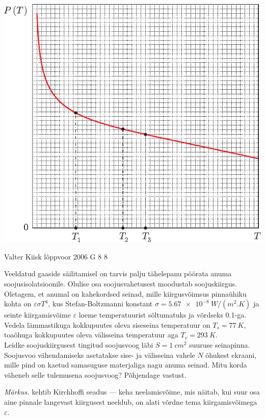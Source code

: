 \documentclass[11pt]{article}
\begin{document}
{{\begin{center}
	\includegraphics[width=0.8\linewidth]{2007-v3g-07-yl}
\end{center}
\fi
}

{Valter Kiisk} %
{lõppvoor} %
{2006} %
{G 8} %
{8} %
{
\ifStatement
Veeldatud gaaside säilitamisel on tarvis palju tähelepanu pöörata anuma soojusisolatsioonile. Olulise osa soojusvahetusest moodustab soojuskiirgus. Oletagem, et anumal on kahekordsed seinad, mille kiirgusvõimsus pinnaühiku kohta on $\varepsilon \sigma T^4$, kus Stefan-Boltzmanni konstant $\sigma = \SI{5,67e-8}{W/(m^2.K)}$ ja seinte kiirgamisvõime $\varepsilon$ loeme temperatuurist sõltumatuks ja võrdseks \num{0,1}-ga. Vedela lämmastikuga kokkupuutes oleva siseseina temperatuur on $T_s = \SI{77}{K}$, toaõhuga kokkupuutes oleva välisseina temperatuur aga $T_v = \SI{293}{K}$.\\
\osa Leidke soojuskiirgusest tingitud soojusvoog läbi $S = \SI{1}{cm^2}$ suuruse seinapinna.\\
\osa Soojusvoo vähendamiseks asetatakse sise- ja välisseina vahele $N$ õhukest ekraani, mille pind on kaetud samasuguse materjaliga nagu anuma seinad. Mitu korda väheneb selle tulemusena soojusvoog? Põhjendage vastust.

\emph{Märkus.} kehtib Kirchhoffi seadus --- keha neelamisvõime, mis näitab, kui suur osa aine pinnale langevast kiirgusest neeldub, on alati võrdne tema kiirgamisvõimega $\varepsilon$.\\
\fi
}

}
\end{document}
